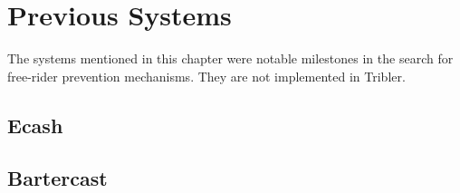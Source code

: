 \chapter{Previous Systems}
The systems mentioned in this chapter were notable milestones in the search for free-rider prevention mechanisms. They are not implemented in Tribler.

\section{Ecash}

\section{Bartercast}

